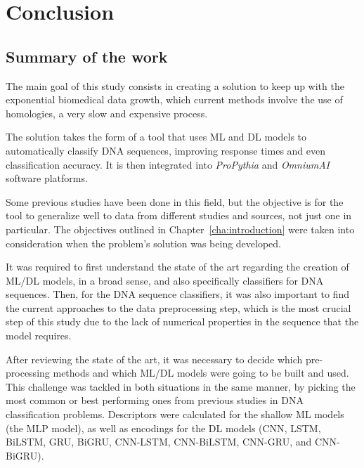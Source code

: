 \chapter{Conclusion}

\section{Summary of the work}

The main goal of this study consists in creating a solution to keep up with the exponential biomedical data growth, which current methods involve the use of homologies, a very slow and expensive process. 

The solution takes the form of a tool that uses \gls{ML} and \gls{DL} models to automatically classify \gls{DNA} sequences, improving response times and even classification accuracy. It is then integrated into \textit{ProPythia} and \textit{OmniumAI} software platforms.

Some previous studies have been done in this field, but the objective is for the tool to generalize well to data from different studies and sources, not just one in particular. The objectives outlined in Chapter~\ref{cha:introduction} were taken into consideration when the problem's solution was being developed.

It was required to first understand the state of the art regarding the creation of \gls{ML}/\gls{DL} models, in a broad sense, and also specifically classifiers for \gls{DNA} sequences. Then, for the \gls{DNA} sequence classifiers, it was also important to find the current approaches to the data preprocessing step, which is the most crucial step of this study due to the lack of numerical properties in the sequence that the model requires. %

After reviewing the state of the art, it was necessary to decide which pre-processing methods and which \gls{ML}/\gls{DL} models were going to be built and used. This challenge was tackled in both situations in the same manner, by picking the most common or best performing ones from previous studies in \gls{DNA} classification problems. Descriptors were calculated for the shallow \gls{ML} models (the \gls{MLP} model), as well as encodings for the \gls{DL} models (\gls{CNN}, \gls{LSTM}, BiLSTM, \gls{GRU}, BiGRU, CNN-LSTM, CNN-BiLSTM, CNN-GRU, and CNN-BiGRU).

